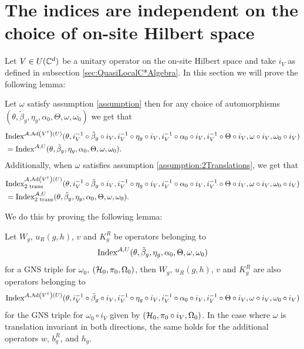\documentclass[11pt,a4paper,twoside]{article}
\numberwithin{equation}{section}
\begin{document}
	\section{The indices are independent on the choice of on-site Hilbert space}\label{sec:the-indices-are-independent-on-the-choice-of-on-site-hilbert-space}
	Let $V \in U(\CC^d)$ be a unitary operator on the on-site Hilbert space and take $i_V$ as defined in subsection \ref{sec:QuasiLocalC*Algebra}. In this section we will prove the following lemma:
	\begin{lemma}\label{lem:IndependenceOnChoiceOnSitHilbertSpace}
		Let $\omega$ satisfy assumption \ref{assumption} then for any choice of automorphisms $(\theta,\tilde{\beta}_g,\eta_g,\alpha_0,\Theta,\omega,\omega_0)$ we get that
		\begin{align}
			&\textrm{Index}^{\AA,\Ad{V^\dagger}(U)}(\theta,i_V^{-1}\circ\tilde{\beta}_g\circ i_V,i_V^{-1}\circ\eta_g\circ i_V,i_V^{-1}\circ\alpha_0\circ i_V,i_V^{-1}\circ\Theta\circ i_V,\omega\circ i_V,\omega_0\circ i_V)\\
			&=\textrm{Index}^{\AA,U}(\theta,\tilde{\beta}_g,\eta_g,\alpha_0,\Theta,\omega,\omega_0).
		\end{align}
		Additionally, when $\omega$ satisfies assumption \ref{assumption:2Translations}, we get that
		\begin{align}
			&\textrm{Index}^{\AA,\Ad{V^\dagger}(U)}_{\textrm{2 trans}}(\theta,i_V^{-1}\circ\tilde{\beta}_g\circ i_V,i_V^{-1}\circ\eta_g\circ i_V,i_V^{-1}\circ\alpha_0\circ i_V,i_V^{-1}\circ\Theta\circ i_V,\omega\circ i_V,\omega_0\circ i_V)\\
			&=\textrm{Index}^{\AA,U}_{\textrm{2 trans}}(\theta,\tilde{\beta}_g,\eta_g,\alpha_0,\Theta,\omega,\omega_0).
		\end{align}
	\end{lemma}
	We do this by proving the following lemma:
	\begin{lemma}\label{lem:IndependenceOnChoiceOnSitHilbertSpaceOperatorsBelongingTo}
		Let $W_g$, $u_R(g,h)$, $v$ and $K^R_g$ be operators belonging to
		\begin{equation}
			\textrm{Index}^{\AA,U}(\theta,\tilde{\beta}_g,\eta_g,\alpha_0,\Theta,\omega,\omega_0)
		\end{equation}
		for a GNS triple for $\omega_0$, $(\HH_0,\pi_0,\Omega_0)$, then $W_g$, $u_R(g,h)$, $v$ and $K^R_g$ are also operators belonging to
		\begin{equation}
			\textrm{Index}^{\AA,\Ad{V^\dagger}(U)}(\theta,i_V^{-1}\circ\tilde{\beta}_g\circ i_V,i_V^{-1}\circ\eta_g\circ i_V,i_V^{-1}\circ\alpha_0\circ i_V,i_V^{-1}\circ\Theta\circ i_V,\omega\circ i_V,\omega_0\circ i_V)
		\end{equation}
		for the GNS triple for $\omega_0\circ i_V$ given by $(\HH_0,\pi_0\circ i_V,\Omega_0)$. In the case where $\omega$ is translation invariant in both directions, the same holds for the additional operators $w$, $b_g^R$, and $h_g$.
	\end{lemma}
\end{document}
